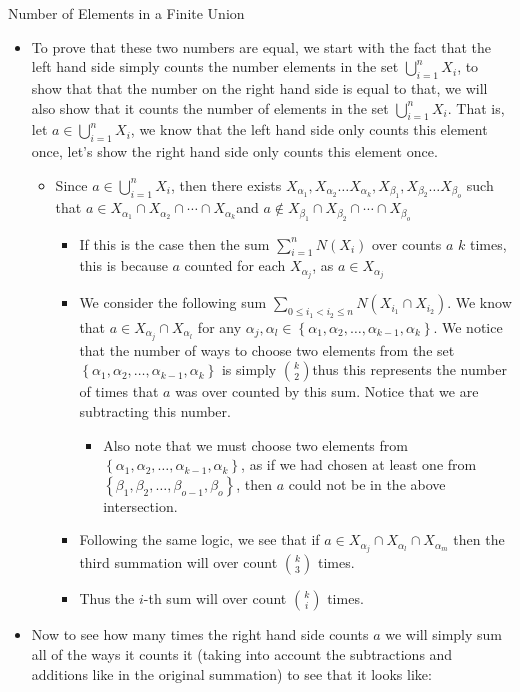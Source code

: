 \documentclass{standalone}
\begin{document}
\begin{theo*}{Number of Elements in a Finite Union}
\begin{pf}
\begin{itemize}
  \item To prove that these two numbers are equal, we start with the fact that the left hand side simply counts the number elements in the set $\bigcup_{i=1}^{n} X_{i}$, to show that that the number on the right hand side is equal to that, we will also show that it counts the number of elements in the set $\bigcup_{i=1}^{n} X_{i}$. That is, let $a \in  \bigcup_{i=1}^{n} X_{i}$, we know that the left hand side only counts this element once, let's show the right hand side only counts this element once.
  \begin{itemize}
    \item Since $a \in  \bigcup_{i=1}^{n} X_{i}$, then there exists $X_{\alpha_{1}}, X _{\alpha_{2}} \ldots X_{\alpha_{k}}, X_{\beta_{1}}, X _{\beta{_2}} \ldots X_{\beta_{o}} $ such that $a \in X_{\alpha_{1}} \cap X _{\alpha_{2}} \cap \dotsb \cap X_{\alpha_{k}}  $and $a \not\in X_{\beta_{1}} \cap X _{\beta_{2}} \cap \dotsb \cap X_{\beta_{o}}  $
    \begin{itemize}
      \item If this is the case then the sum $\sum_{i=1}^{n} N\left(X_{i}\right)$ over counts $a$ ${k}$ times, this is because $a$ counted for each $X_{\alpha_{j}}$, as $a \in X_{\alpha_{j}}$
      \item We consider the following sum $\sum_{0 \le i_{1} < i_{2} \le n} N\left(X_{i_{1}} \cap X_{i_{2}}\right)$. We know that $a \in X_{\alpha_{j}} \cap X_{\alpha_{l}}$ for any $\alpha_{j}, \alpha_{l} \in \left\{ \alpha_{1} , \alpha_{2} , \dotsc  , \alpha_{k - 1} , \alpha_{k} \right\} $. We notice that the number of ways to choose two elements from the set $\left\{ \alpha_{1} , \alpha_{2} , \dotsc  , \alpha_{k - 1} , \alpha_{k} \right\}$ is simply $\binom{{k}}{2}$thus this represents the number of times that $a$ was over counted by this sum. Notice that we are subtracting this number.
      \begin{itemize}
        \item Also note that we must choose two elements from $\left\{ \alpha_{1} , \alpha_{2} , \dotsc  , \alpha_{k - 1} , \alpha_{k} \right\}$, as if we had chosen at least one from $\left\{ \beta_{1} , \beta_{2} , \dotsc  , \beta_{o - 1} , \beta_{o} \right\}$, then $a$ could not be in the above intersection.
      \end{itemize}
      \item Following the same logic, we see that if $a \in X_{\alpha_{j}} \cap X_{\alpha_{l}} \cap X_{\alpha_{m}}$ then the third summation will over count $\binom{{k}}{3}$ times.
      \item Thus the $i$-th sum will over count $\binom{{k}}{i}$ times.
    \end{itemize}
  \end{itemize}
  \item Now to see how many times the right hand side counts $a$ we will simply sum all of the ways it counts it (taking into account the subtractions and additions like in the original summation) to see that it looks like:


\end{itemize}
\end{pf}
\end{theo*}
\end{document}
